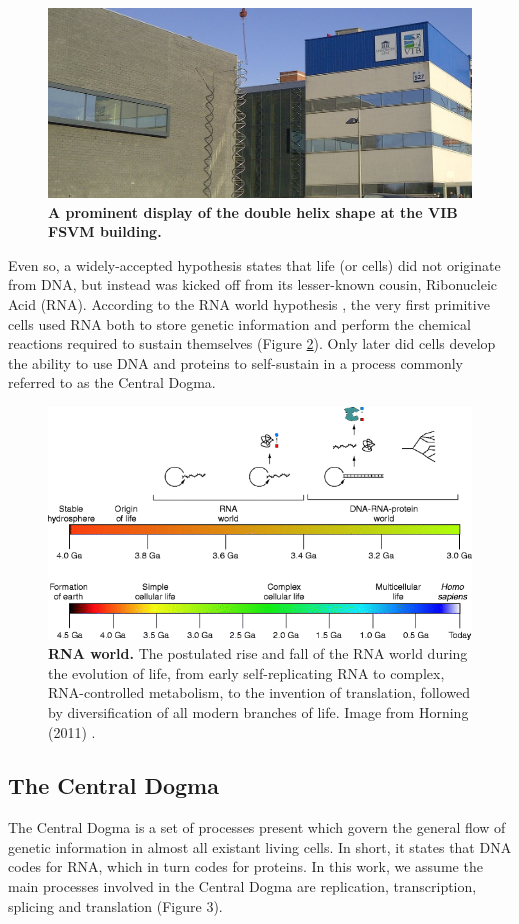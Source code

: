 \begin{figure}
	\centering\includegraphics[width=.5\linewidth]{fig/introduction/fsvm3} %
	\caption{
		\textbf{A prominent display of the double helix shape at the VIB FSVM building.} %
	}
	\label{fig:fsvm}
\end{figure}

Even so, a widely-accepted hypothesis states that life (or cells) did not originate from DNA, but instead was kicked off from its lesser-known cousin, Ribonucleic Acid (RNA). According to the RNA world hypothesis \cite{alberts_rnaworldorigins_2002}, the very first primitive cells used RNA both to store genetic information and perform the chemical reactions required to sustain themselves (Figure \ref{fig:rnaworld}). Only later did cells develop the ability to use DNA and proteins to self-sustain in a process commonly referred to as the Central Dogma.

\begin{figure}
	\centering\includegraphics[width=.5\linewidth]{fig/introduction/rnaworld} %
	\caption{
		\textbf{RNA world.} The postulated rise and fall of the RNA world during the evolution of life, from early self-replicating RNA to complex, RNA-controlled metabolism, to the invention of translation, followed by diversification of all modern branches of life. Image from Horning (2011) \cite{horning_rnaworld_2011}. %
	}
	\label{fig:rnaworld}
\end{figure}
\subsection{The Central Dogma}
The Central Dogma is a set of processes present which govern the general flow of genetic information in almost all existant living cells. In short, it states that DNA codes for RNA, which in turn codes for proteins. In this work, we assume the main processes involved in the Central Dogma are replication, transcription, splicing and translation (Figure 3). 

